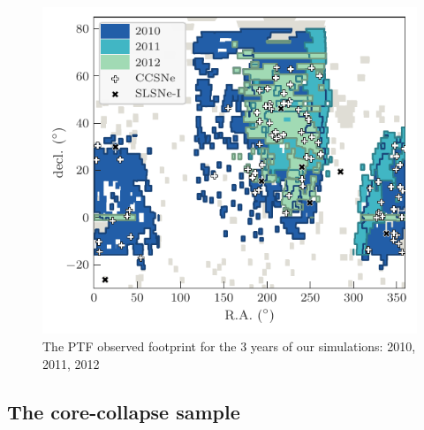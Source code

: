 \documentclass[a4paper,fleqn,usenatbib]{mnras}
\begin{document}
\begin{figure}
	\includegraphics[width=\columnwidth]{./CCSN_Sky_Sim.pdf}
    \caption{The PTF observed footprint for the 3 years of our simulations: 2010, 2011, 2012}
    \label{fig:ptfSky}
\end{figure}

\subsection{The core-collapse sample}
\label{sec:CCSample}
\end{document}
